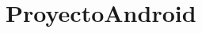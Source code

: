 \chapter{Proyecto\+Android}
\hypertarget{md__r_e_a_d_m_e}{}\label{md__r_e_a_d_m_e}
\label{md__r_e_a_d_m_e_autotoc_md0}%
%
